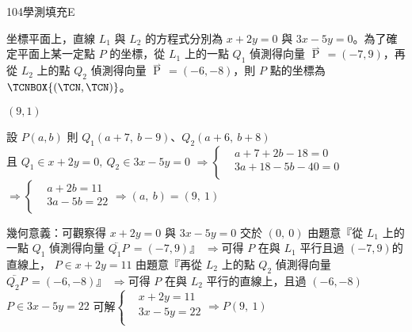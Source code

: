     \begin{QUESTION}
        \begin{ExamInfo}{104}{學測}{填充}{E}
        \end{ExamInfo}
        \begin{ExamAnsRateInfo}{31}{71}{21}{1}
        \end{ExamAnsRateInfo}
        \begin{QBODY}
            坐標平面上，直線 ${{L}_{1}}$ 與 ${{L}_{2}}$ 的方程式分別為 $x+2y=0$ 與 $3x-5y=0$。為了確定平面上某一定點 $P$ 的坐標，從 ${{L}_{1}}$ 上的一點 ${{Q}_{1}}$ 偵測得向量 $\overset{\rightharpoonup }{\mathop{{{Q}_{1}}P}}\,=\left( -7,9 \right)$，再從 ${{L}_{2}}$ 上的點 ${{Q}_{2}}$ 偵測得向量 $\overset{\rightharpoonup }{\mathop{{{Q}_{2}}P}}\,=\left( -6,-8 \right)$，則 $P$ 點的坐標為 $\TCNBOX{\left( \TCN, \TCN \right)}$。
        \end{QBODY}
        \begin{QFROMS}
        \end{QFROMS}
        \begin{QTAGS}\end{QTAGS}
        \begin{QANS}
            $(9,1)$
        \end{QANS}
        \begin{QSOLLIST}
            \begin{QSOL}
				設 $P\left( a,b \right)$ 則 ${{Q}_{1}}\left( a+7,\ b-9 \right)$、${{Q}_{2}}\left( a+6,\ b+8 \right)$\\
				且 ${{Q}_{1}}\in x+2y=0,\ {{Q}_{2}}\in 3x-5y=0$
				$\Rightarrow \left\{ \begin{aligned}
				  & a+7+2b-18=0 \\ 
				 & 3a+18-5b-40=0 \\ 
				\end{aligned} \right.$$\Rightarrow \left\{ \begin{aligned}
				  & a+2b=11 \\ 
				 & 3a-5b=22 \\ 
				\end{aligned} \right.\Rightarrow \left( a,\ b \right)=\left( 9,\ 1 \right)$

			\end{QSOL}
\begin{QSOL}
				 幾何意義：可觀察得 $x+2y=0$ 與 $3x-5y=0$ 交於 $\left( 0,\ 0 \right)$
				  由題意『從 ${{L}_{1}}$ 上的一點 ${{Q}_{1}}$ 偵測得向量 $\lvec{{Q}_{1}P}\,=\left( -7,9 \right)$』
				  $\Rightarrow $可得 $P$ 在與 ${{L}_{1}}$ 平行且過 $\left( -7,9 \right)$的直線上， $P\in x+2y=11$
				  由題意『再從 ${{L}_{2}}$ 上的點 ${{Q}_{2}}$ 偵測得向量 $\lvec{{Q}_{2}P}\,=\left( -6,-8 \right)$』
				  $\Rightarrow $可得 $P$ 在與 ${{L}_{2}}$ 平行的直線上，且過 $\left( -6,-8 \right)$ $P\in 3x-5y=22$
				  可解$\left\{ \begin{aligned}
				  & x+2y=11 \\ 
				 & 3x-5y=22 \\ 
				\end{aligned} \right.\Rightarrow P\left( 9,\ 1 \right)$
			\end{QSOL}


\end{QSOLLIST}
\end{QUESTION}
